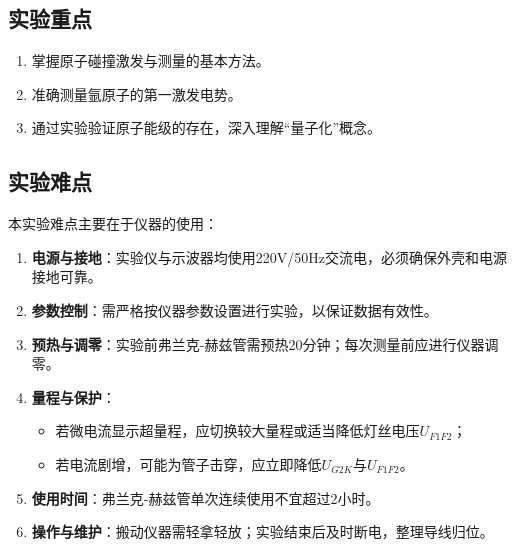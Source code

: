 \documentclass[]{../../templates/Report}%
\begin{document}
\subsection{实验重点}
\begin{enumerate}
\item 掌握原子碰撞激发与测量的基本方法。
\item 准确测量氩原子的第一激发电势。
\item 通过实验验证原子能级的存在，深入理解“量子化”概念。
\end{enumerate}

\subsection{实验难点}
本实验难点主要在于仪器的使用：
\begin{enumerate}
\item \textbf{电源与接地}：实验仪与示波器均使用220V/50Hz交流电，必须确保外壳和电源接地可靠。
\item \textbf{参数控制}：需严格按仪器参数设置进行实验，以保证数据有效性。
\item \textbf{预热与调零}：实验前弗兰克-赫兹管需预热20分钟；每次测量前应进行仪器调零。
\item \textbf{量程与保护}：
\begin{itemize}
\item 若微电流显示超量程，应切换较大量程或适当降低灯丝电压$U_{F1F2}$；
\item 若电流剧增，可能为管子击穿，应立即降低$U_{G2K}$与$U_{F1F2}$。
\end{itemize}
\item \textbf{使用时间}：弗兰克-赫兹管单次连续使用不宜超过2小时。
\item \textbf{操作与维护}：搬动仪器需轻拿轻放；实验结束后及时断电，整理导线归位。
\end{enumerate}
\end{document}
